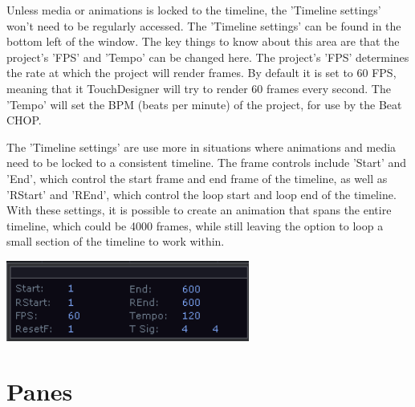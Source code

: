 \begin{fullwidth}

Unless media or animations is locked to the timeline, the 'Timeline settings' won't need to be regularly accessed. The 'Timeline settings' can be found in the bottom left of the window. The key things to know about this area are that the project's 'FPS' and 'Tempo' can be changed here. The project's 'FPS' determines the rate at which the project will render frames. By default it is set to 60 FPS, meaning that it TouchDesigner will try to render 60 frames every second. The 'Tempo' will set the BPM (beats per minute) of the project, for use by the Beat CHOP. 

The 'Timeline settings' are use more in situations where animations and media need to be locked to a consistent timeline. The frame controls include 'Start' and 'End', which control the start frame and end frame of the timeline, as well as 'RStart' and 'REnd', which control the loop start and loop end of the timeline. With these settings, it is possible to create an animation that spans the entire timeline, which could be 4000 frames, while still leaving the option to loop a small section of the timeline to work within. 

\begin{center}
\includegraphics[width=8cm]{./img/2.4/timeline.png}
\end{center}

\end{fullwidth}
\section{Panes}

